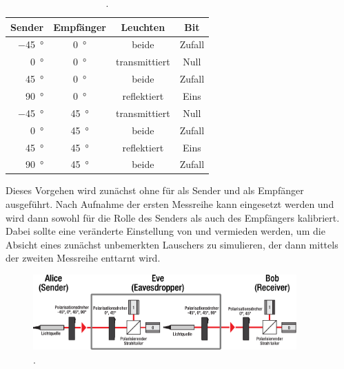 \begin{table}
	\centering
	\caption{.}
	\label{tab:kombination}
	\begin{tabular}{rccc}
		\toprule
		Sender & Empfänger & Leuchten & Bit \\
		\midrule
		\qty{-45}{\degree}\hspace{1ex} & \qty{0}{\degree} & beide & Zufall \\
		\qty{  0}{\degree}\hspace{1ex} & \qty{0}{\degree} & transmittiert & Null \\
		\qty{ 45}{\degree}\hspace{1ex} & \qty{0}{\degree} & beide & Zufall \\
		\qty{ 90}{\degree}\hspace{1ex} & \qty{0}{\degree} & reflektiert & Eins \\
		\qty{-45}{\degree}\hspace{1ex} & \qty{45}{\degree} & transmittiert & Null \\
		\qty{  0}{\degree}\hspace{1ex} & \qty{45}{\degree} & beide & Zufall \\
		\qty{ 45}{\degree}\hspace{1ex} & \qty{45}{\degree} & reflektiert & Eins \\
		\qty{ 90}{\degree}\hspace{1ex} & \qty{45}{\degree} & beide & Zufall \\
		\bottomrule
	\end{tabular}
\end{table}

Dieses Vorgehen wird zunächst ohne \grqq{} für \grqq{} als Sender und \grqq{} als Empfänger ausgeführt.
Nach Aufnahme der ersten Messreihe kann \grqq{} eingesetzt werden und wird dann sowohl für die Rolle des Senders als auch des
Empfängers kalibriert. Dabei sollte eine veränderte Einstellung von \grqq{} und \grqq{} vermieden werden, um die
Absicht eines zunächst unbemerkten Lauschers zu simulieren, der dann mittels der zweiten Messreihe enttarnt wird.

\begin{figure}[H]
	\centering
	\includegraphics[width=0.9\textwidth]{content/aufbau/schema.pdf}
	\caption{. \cite{krypt}}
	\label{fig:schema}
\end{figure}

